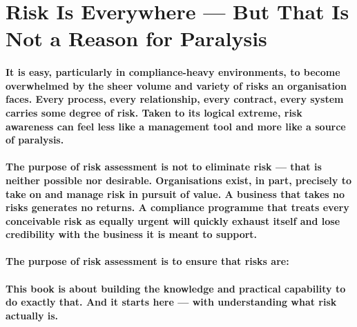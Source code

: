 \newpage
\section{Risk Is Everywhere — But That Is Not a Reason for Paralysis}

\paragraph{It is easy, particularly in compliance-heavy environments, to become overwhelmed by the sheer volume and variety of risks an organisation faces. Every process, every relationship, every contract, every system carries some degree of risk. Taken to its logical extreme, risk awareness can feel less like a management tool and more like a source of paralysis.}

\paragraph{The purpose of risk assessment is not to eliminate risk — that is neither possible nor desirable. Organisations exist, in part, precisely to take on and manage risk in pursuit of value. A business that takes no risks generates no returns. A compliance programme that treats every conceivable risk as equally urgent will quickly exhaust itself and lose credibility with the business it is meant to support.}

\paragraph{The purpose of risk assessment is to ensure that risks are:}

\begin{itemize}
\end{itemize}

\paragraph{This book is about building the knowledge and practical capability to do exactly that. And it starts here — with understanding what risk actually is.}

